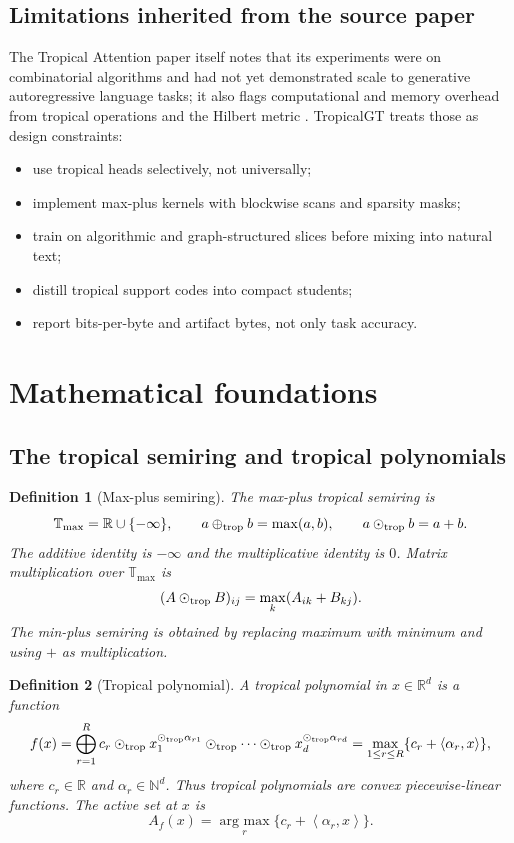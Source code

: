 \documentclass[11pt]{article}
\newtheorem{definition}{Definition}[section]
\newcommand{\R}{\mathbb{R}}
\newcommand{\N}{\mathbb{N}}
\newcommand{\T}{\mathbb{T}}
\newcommand{\oplusT}{\oplus_{\rm trop}}
\newcommand{\odotT}{\odot_{\rm trop}}
\newcommand{\argmax}{\operatorname*{arg\ max}}
\newcommand{\ip}[2]{\left\langle #1,#2\right\rangle}
\begin{document}
\subsection{Limitations inherited from the source paper}

The Tropical Attention paper itself notes that its experiments were on combinatorial algorithms and had not yet demonstrated scale to generative autoregressive language tasks; it also flags computational and memory overhead from tropical operations and the Hilbert metric \cite{hashemi2025tropical}.  TropicalGT treats those as design constraints:
\begin{itemize}
\item use tropical heads selectively, not universally;
\item implement max-plus kernels with blockwise scans and sparsity masks;
\item train on algorithmic and graph-structured slices before mixing into natural text;
\item distill tropical support codes into compact students;
\item report bits-per-byte and artifact bytes, not only task accuracy.
\end{itemize}

\section{Mathematical foundations}

\subsection{The tropical semiring and tropical polynomials}

\begin{definition}[Max-plus semiring]
The max-plus tropical semiring is
\begin{equation}
\T_{\max}=\R\cup\{-\infty\},\qquad a\oplusT b=\max(a,b),\qquad a\odotT b=a+b.
\end{equation}
The additive identity is \(-\infty\) and the multiplicative identity is \(0\).  Matrix multiplication over \(\T_{\max}\) is
\begin{equation}
(A\odotT B)_{ij}=\max_k(A_{ik}+B_{kj}).
\end{equation}
The min-plus semiring is obtained by replacing maximum with minimum and using \(+\) as multiplication.
\end{definition}

\begin{definition}[Tropical polynomial]
A tropical polynomial in \(x\in\R^d\) is a function
\begin{equation}
f(x)=\bigoplus_{r=1}^R c_r\odotT x_1^{\odotT \alpha_{r1}}\odotT\cdots\odotT x_d^{\odotT \alpha_{rd}}
     =\max_{1\le r\le R}\{c_r+\ip{\alpha_r}{x}\},
\end{equation}
where \(c_r\in\R\) and \(\alpha_r\in\N^d\).  Thus tropical polynomials are convex piecewise-linear functions.  The active set at \(x\) is
\begin{equation}
A_f(x)=\argmax_r\{c_r+\ip{\alpha_r}{x}\}.
\end{equation}
\end{definition}
\end{document}
